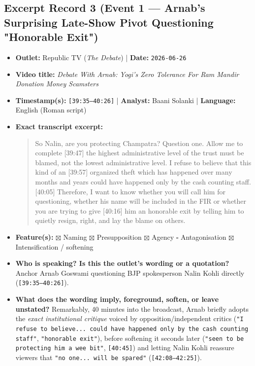 \documentclass[10pt,a4paper]{article}
\begin{document}
\subsection*{Excerpt Record 3 (Event 1 --- Arnab's Surprising Late-Show Pivot Questioning "Honorable Exit")}
\begin{itemize}[leftmargin=1.5em, itemsep=3pt, topsep=4pt]
  \item \textbf{Outlet:} Republic TV (\textit{The Debate}) | \textbf{Date:} \texttt{2026-06-26}
  \item \textbf{Video title:} \textit{Debate With Arnab: Yogi's Zero Tolerance For Ram Mandir Donation Money Scamsters}
  \item \textbf{Timestamp(s):} \texttt{[39:35--40:26]} | \textbf{Analyst:} Baani Solanki | \textbf{Language:} English (Roman script)
  \item \textbf{Exact transcript excerpt:}
    \begin{quote}\small{} So Nalin, are you protecting Champatra? Question one. Allow me to complete [39:47] the highest administrative level of the trust must be blamed, not the lowest administrative level. I refuse to believe that this kind of an [39:57] organized theft which has happened over many months and years could have happened only by the cash counting staff. [40:05] Therefore, I want to know whether you will call him for questioning, whether his name will be included in the FIR or whether you are trying to give [40:16] him an honorable exit by telling him to quietly resign, right, and lay the blame on others.\end{quote}
  \item \textbf{Feature(s):} $\boxtimes$ Naming $\boxtimes$ Presupposition $\boxtimes$ Agency $\square$ Antagonisation $\boxtimes$ Intensification / softening
  \item \textbf{Who is speaking? Is this the outlet's wording or a quotation?} Anchor Arnab Goswami questioning BJP spokesperson Nalin Kohli directly (\texttt{[39:35--40:26]}).
  \item \textbf{What does the wording imply, foreground, soften, or leave unstated?} Remarkably, 40 minutes into the broadcast, Arnab briefly adopts the \textit{exact institutional critique} voiced by opposition/independent critics (\texttt{"I refuse to believe... could have happened only by the cash counting staff"}, \texttt{"honorable exit"}), before softening it seconds later (\texttt{"seen to be protecting him a wee bit"}, \texttt{[40:45]}) and letting Nalin Kohli reassure viewers that \texttt{"no one... will be spared"} (\texttt{[42:08--42:25]}).

\end{itemize}
\end{document}
